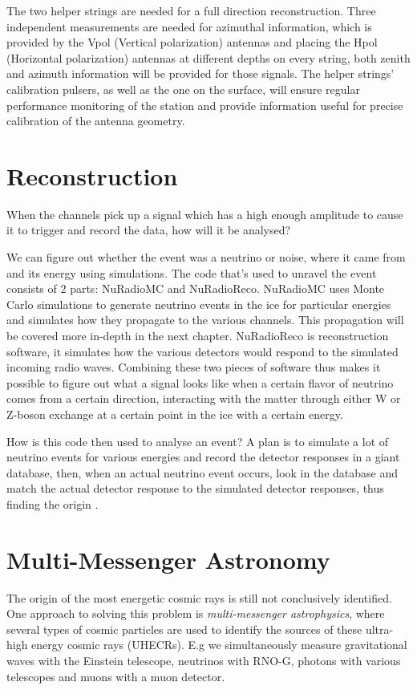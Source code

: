 The two helper strings are needed for a full direction reconstruction.
Three independent measurements are needed for azimuthal information, which is
provided by the Vpol (Vertical polarization) antennas and placing the Hpol
(Horizontal polarization) antennas at different depths on every string, both
zenith and azimuth information will be provided for those signals. The helper
strings' calibration pulsers, as well as the one on the surface, will ensure
regular performance monitoring of the station and provide information
useful for precise calibration of the antenna geometry.

\section{Reconstruction}
\label{sec:Reconstruction}
When the channels pick up a signal which has a high enough amplitude to
cause it to trigger and record the data, how will it be analysed?

We can figure out whether the event was a neutrino or noise, where it came from
and its energy using simulations. The code that's used to unravel the event
consists of 2 parts: NuRadioMC\cite{Glaser_2020} and
NuRadioReco\cite{Glaser_2019}. NuRadioMC uses Monte Carlo simulations to
generate neutrino events in the ice for particular energies and simulates how
they propagate to the various channels. This propagation will be covered more
in-depth in the next chapter.  NuRadioReco is reconstruction software, it
simulates how the various detectors would respond to the simulated incoming
radio waves.  Combining these two pieces of software thus makes it possible to
figure out what a signal looks like when a certain flavor of neutrino  
comes from a certain direction, interacting with the matter through
either W or Z-boson exchange at a certain point in the ice with a certain
energy. 

How is this code then used to analyse an event?
A plan \cite{lookuptable} is to simulate a lot of neutrino events for various energies and
record the detector responses in a giant database, then, when an actual neutrino
event occurs, look in the database and match the actual
detector response to the simulated detector responses, thus finding the origin .

\section{Multi-Messenger Astronomy}
The origin of the most energetic cosmic rays is still not conclusively
identified. One approach to solving this problem is \textit{multi-messenger
astrophysics}, where several types of cosmic particles are used to identify the
sources of these ultra-high energy cosmic rays (UHECRs). E.g we simultaneously
measure gravitational waves with the Einstein telescope, neutrinos with RNO-G,
photons with various telescopes and muons with a muon detector.

